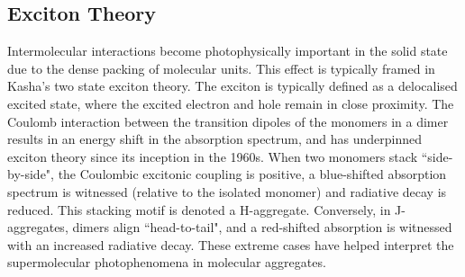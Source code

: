 \subsection{Exciton Theory}\label{section: lom intermolecular-interactions}
Intermolecular interactions become photophysically important in the solid state due to the dense packing of molecular units. This effect is typically framed in Kasha's two state exciton theory.\cite{Gierschner2009,Gierschner2013,Gierschner2013a,Hestand2017,Shi2017} The exciton is typically defined as a delocalised excited state, where the excited electron and hole remain in close proximity. The Coulomb interaction between the transition dipoles of the monomers in a dimer results in an energy shift in the absorption spectrum, and has underpinned exciton theory since its inception in the 1960s.\cite{Kasha1965a} When two monomers stack ``side-by-side", the Coulombic excitonic coupling is positive, a blue-shifted absorption spectrum is witnessed (relative to the isolated monomer) and radiative decay is reduced. This stacking motif is denoted a H-aggregate. Conversely, in J-aggregates, dimers align ``head-to-tail", and a red-shifted absorption is witnessed with an increased radiative decay. These extreme cases have helped interpret the supermolecular photophenomena in molecular aggregates.

